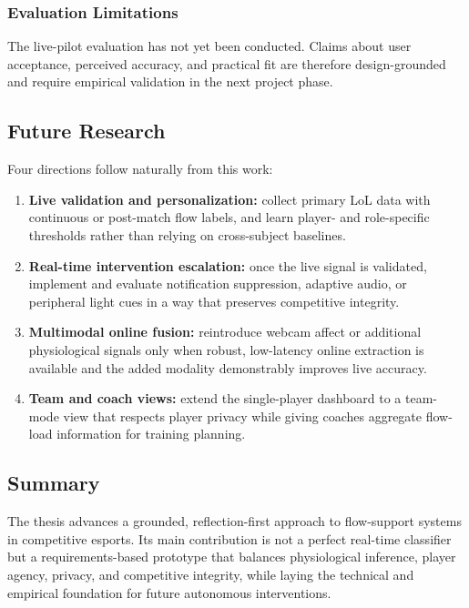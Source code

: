 \subsubsection{Evaluation Limitations}

The live-pilot evaluation has not yet been conducted. Claims about user acceptance, perceived accuracy, and practical fit are therefore design-grounded and require empirical validation in the next project phase.

\subsection{Future Research}

Four directions follow naturally from this work:

\begin{enumerate}
    \item \textbf{Live validation and personalization:} collect primary LoL data with continuous or post-match flow labels, and learn player- and role-specific thresholds rather than relying on cross-subject baselines.
    \item \textbf{Real-time intervention escalation:} once the live signal is validated, implement and evaluate notification suppression, adaptive audio, or peripheral light cues in a way that preserves competitive integrity.
    \item \textbf{Multimodal online fusion:} reintroduce webcam affect or additional physiological signals only when robust, low-latency online extraction is available and the added modality demonstrably improves live accuracy.
    \item \textbf{Team and coach views:} extend the single-player dashboard to a team-mode view that respects player privacy while giving coaches aggregate flow-load information for training planning.
\end{enumerate}

\subsection{Summary}

The thesis advances a grounded, reflection-first approach to flow-support systems in competitive esports. Its main contribution is not a perfect real-time classifier but a requirements-based prototype that balances physiological inference, player agency, privacy, and competitive integrity, while laying the technical and empirical foundation for future autonomous interventions.
